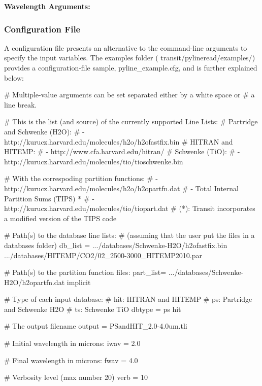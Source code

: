 \documentclass[letterpaper, 12pt]{article}
\begin{document}


{\bf Wavelength Arguments:} \newline
{}



\subsubsection{Configuration File}
\label{sec:pylinecfg}

A configuration file presents an alternative to the command-line
arguments to specify the input variables.  The examples folder ({\tttm
  transit/pylineread/examples/}) provides a configuration-file sample,
{\tttm pyline\_example.cfg}, and is further explained below: \newline

\begin{plain}
[Parameters]
# Multiple-value arguments can be set separated either by a white space or
# a line break.

# This is the list (and source) of the currently supported Line Lists:
# Partridge and Schwenke (H2O):
#   - http://kurucz.harvard.edu/molecules/h2o/h2ofastfix.bin
# HITRAN and HITEMP:
#   - http://www.cfa.harvard.edu/hitran/
# Schwenke (TiO):
#   - http://kurucz.harvard.edu/molecules/tio/tioschwenke.bin

# With the correspoding partition functions:
#   - http://kurucz.harvard.edu/molecules/h2o/h2opartfn.dat
#   - Total Internal Partition Sums (TIPS) *
#   - http://kurucz.harvard.edu/molecules/tio/tiopart.dat
# (*): Transit incorporates a modified version of the TIPS code

# Path(s) to the database line lists:
# (assuming that the user put the files in a databases folder)
db_list  = .../databases/Schwenke-H2O/h2ofastfix.bin
           .../databases/HITEMP/CO2/02_2500-3000_HITEMP2010.par

# Path(s) to the partition function files:
part_list= .../databases/Schwenke-H2O/h2opartfn.dat
           implicit

# Type of each input database:
#   hit:  HITRAN and HITEMP
#   ps:   Partridge and Schwenke H2O
#   ts:   Schwenke TiO
dbtype   = ps hit

# The output filename
output   = PSandHIT_2.0-4.0um.tli

# Initial wavelength in microns:
iwav     = 2.0

# Final wavelength in microns:
fwav     = 4.0

# Verbosity level (max number 20)
verb     = 10
\end{plain} 
\vspace{10pt}
\end{document}
